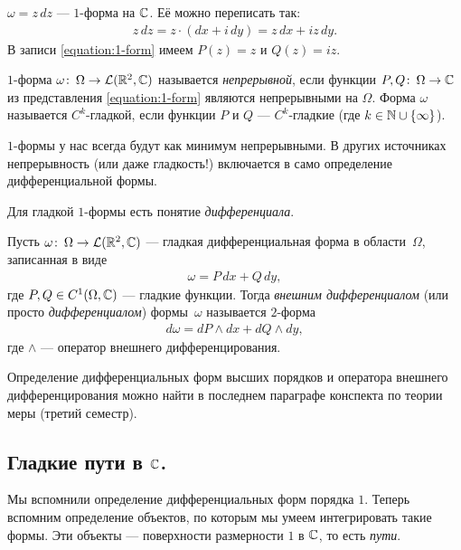 \documentclass[../complex-analysis.tex]{subfiles}
\begin{document}
\begin{exmpl*}
 $ \omega=z\,dz $ --- $ 1 $-форма на $ \mathbb{C} $. Её можно переписать так:
 \begin{align*}
  z\,dz = z \cdot (dx + i\,dy) = z\,dx + iz\,dy.
 \end{align*} В записи \eqref{equation:1-form} имеем  $ P(z)=z $ и $ Q(z)=iz $.
\end{exmpl*}

\begin{df*}
 $1$-форма $\omega \colon\, \Omega \to \mathcal{L}(\mathbb{R}^2, \mathbb{C})$ называется \textit{непрерывной}, если функции $P,Q \colon\, \Omega \to \mathbb{C}$ из представления \eqref{equation:1-form} являются непрерывными на $ \Omega $. Форма $\omega$ называется $C^{k}$-гладкой, если функции $P$ и $Q$ --- $C^{k}$-гладкие (где $k \in \mathbb{N} \cup \left\{ \infty \right\}$).
\end{df*}

$ 1 $-формы у нас всегда будут как минимум непрерывными. В других источниках непрерывность (или даже гладкость!) включается в само определение дифференциальной формы.

Для гладкой $ 1 $-формы есть понятие \emph{дифференциала}.

\begin{df}
 Пусть $ \omega\colon\,\Omega \to \mathcal{L}(\mathbb{R}^2, \mathbb{C}) $ --- гладкая дифференциальная форма в области~$ \Omega $, записанная в виде
 \begin{align*}
  \omega = P\,dx + Q\,dy,
 \end{align*} где $ P,Q \in C^{1}(\Omega,\mathbb{C}) $ --- гладкие функции. Тогда \emph{внешним дифференциалом} (или просто \emph{дифференциалом}) формы~$ \omega $ называется $ 2 $-форма
 \begin{align*}
  d\omega = dP \land dx + dQ \land dy,
 \end{align*} где $ \land $ --- оператор внешнего дифференцирования.
\end{df}

Определение дифференциальных форм высших порядков и оператора внешнего дифференцирования можно найти в последнем параграфе конспекта по теории меры (третий семестр).

\subsection{Гладкие пути в \texorpdfstring{$\mathbb{C}$}{комплексной плоскости}.}

Мы вспомнили определение дифференциальных форм порядка $1$. Теперь вспомним определение объектов, по которым мы умеем интегрировать такие формы. Эти объекты --- поверхности размерности $1$ в $\mathbb{C}$, то есть \textit{пути}.
\end{document}
